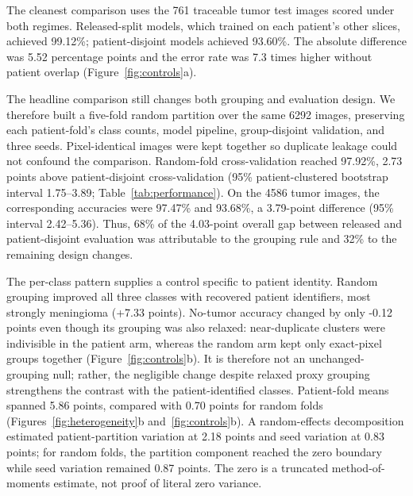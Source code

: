 ﻿\documentclass[twocolumn]{article}
\begin{document}
The cleanest comparison uses the 761 traceable tumor test images scored under both regimes. Released-split models, which trained on each patient's other slices, achieved 99.12\%; patient-disjoint models achieved 93.60\%. The absolute difference was 5.52 percentage points and the error rate was 7.3 times higher without patient overlap (Figure~\ref{fig:controls}a).

The headline comparison still changes both grouping and evaluation design. We therefore built a five-fold random partition over the same 6292 images, preserving each patient-fold's class counts, model pipeline, group-disjoint validation, and three seeds. Pixel-identical images were kept together so duplicate leakage could not confound the comparison. Random-fold cross-validation reached 97.92\%, 2.73 points above patient-disjoint cross-validation (95\% patient-clustered bootstrap interval 1.75--3.89; Table~\ref{tab:performance}). On the 4586 tumor images, the corresponding accuracies were 97.47\% and 93.68\%, a 3.79-point difference (95\% interval 2.42--5.36). Thus, 68\% of the 4.03-point overall gap between released and patient-disjoint evaluation was attributable to the grouping rule and 32\% to the remaining design changes.

The per-class pattern supplies a control specific to patient identity. Random grouping improved all three classes with recovered patient identifiers, most strongly meningioma (+7.33 points). No-tumor accuracy changed by only -0.12 points even though its grouping was also relaxed: near-duplicate clusters were indivisible in the patient arm, whereas the random arm kept only exact-pixel groups together (Figure~\ref{fig:controls}b). It is therefore not an unchanged-grouping null; rather, the negligible change despite relaxed proxy grouping strengthens the contrast with the patient-identified classes. Patient-fold means spanned 5.86 points, compared with 0.70 points for random folds (Figures~\ref{fig:heterogeneity}b and~\ref{fig:controls}b). A random-effects decomposition estimated patient-partition variation at 2.18 points and seed variation at 0.83 points; for random folds, the partition component reached the zero boundary while seed variation remained 0.87 points. The zero is a truncated method-of-moments estimate, not proof of literal zero variance.
\end{document}
